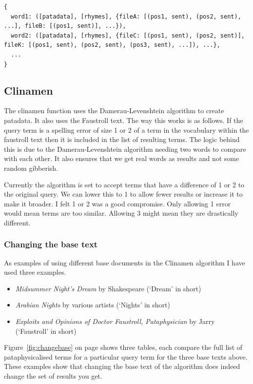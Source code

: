 \begin{verbatim}
{
  word1: ([patadata], [rhymes], {fileA: [(pos1, sent), (pos2, sent), ...], fileB: [(pos1, sent)], ...}),
  word2: ([patadata], [rhymes], {fileC: [(pos1, sent), (pos2, sent)], fileK: [(pos1, sent), (pos2, sent), (pos3, sent), ...]), ...},
  ...
}
\end{verbatim}


\subsection{Clinamen}

The clinamen function uses the Damerau-Levenshtein algorithm to create patadata. It also uses the Faustroll text. The way this works is as follows. If the query term is a spelling error of size 1 or 2 of a term in the vocabulary within the faustroll text then it is included in the list of resulting terms. The logic behind this is due to the Damerau-Levenshtein algorithm needing two words to compare with each other. It also ensures that we get real words as results and not some random gibberish.

Currently the algorithm is set to accept terms that have a difference of 1 or 2 to the original query. We can lower this to 1 to allow fewer results or increase it to make it broader. I felt 1 or 2 was a good compromise. Only allowing 1 error would mean terms are too similar. Allowing 3 might mean they are drastically different.


\subsubsection{Changing the base text}
\label{s:basetext}

As examples of using different base documents in the Clinamen algorithm I have used three examples. 

\begin{itemize}
  \item \textit{Midsummer Night's Dream} by Shakespeare (`Dream' in short)
  \item \textit{Arabian Nights} by various artists (`Nights' in short)
  \item \textit{Exploits and Opinions of Doctor Faustroll, Pataphysician} by Jarry (`Faustroll' in short)
\end{itemize}

Figure~\ref{fig:changebase} on page \pageref{fig:changebase} shows three tables, each compare the full list of pataphysicalised terms for a particular query term for the three base texts above. These examples show that changing the base text of the algorithm does indeed change the set of results you get. 

